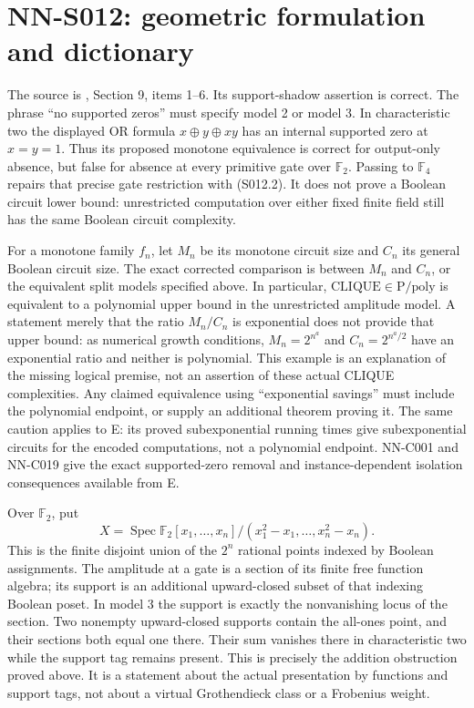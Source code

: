 \section{NN-S012: geometric formulation and dictionary}
\begin{geometricstatement}[NN-S012]
The source is ,
Section 9, items 1--6. Its support-shadow assertion is correct.
The phrase ``no supported zeros'' must specify model 2 or model 3.
In characteristic two the displayed OR formula
$x\oplus y\oplus xy$ has an internal supported zero at $x=y=1$.
Thus its proposed monotone equivalence is correct for output-only
absence, but false for absence at every primitive gate over
$\mathbb F_2$. Passing to $\mathbb F_4$ repairs that precise gate
restriction with (S012.2). It does not prove a Boolean circuit lower
bound: unrestricted computation over either fixed finite field still
has the same Boolean circuit complexity.

For a monotone family $f_n$, let $M_n$ be its monotone circuit size
and $C_n$ its general Boolean circuit size. The exact corrected
comparison is between $M_n$ and $C_n$, or the equivalent split models
specified above. In particular, $\mathrm{CLIQUE}\in\mathrm P/\mathrm{poly}$
is equivalent to a polynomial upper bound in the unrestricted amplitude
model. A statement merely that the ratio $M_n/C_n$ is exponential
does not provide that upper bound: as numerical growth conditions,
$M_n=2^{n^a}$ and $C_n=2^{n^a/2}$ have an exponential ratio and neither
is polynomial. This example is an explanation of the missing logical
premise, not an assertion of these actual CLIQUE complexities.
Any claimed equivalence using ``exponential savings'' must include
the polynomial endpoint, or supply an additional theorem proving it.
The same caution applies to E: its proved subexponential running times
give subexponential circuits for the encoded computations, not a
polynomial endpoint. NN-C001 and NN-C019 give the exact supported-zero
removal and instance-dependent isolation consequences available from E.

Over $\mathbb F_2$, put
\[
 X=\operatorname{Spec}
 \mathbb F_2[x_1,\ldots,x_n]/(x_1^2-x_1,\ldots,x_n^2-x_n).
\]
This is the finite disjoint union of the $2^n$ rational points indexed
by Boolean assignments. The amplitude at a gate is a section of its
finite free function algebra; its support is an additional upward-closed
subset of that indexing Boolean poset. In model 3 the support is exactly
the nonvanishing locus of the section. Two nonempty upward-closed
supports contain the all-ones point, and their sections both equal one
there. Their sum vanishes there in characteristic two while the support
tag remains present. This is precisely the addition obstruction proved
above. It is a statement about the actual presentation by functions and
support tags, not about a virtual Grothendieck class or a Frobenius weight.


\end{geometricstatement}
